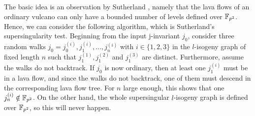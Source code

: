 The basic idea is an observation by Sutherland \cite{sutherland_supersingularity_test}, namely that the lava flows of an ordinary vulcano can only have a bounded number of levels defined over $\mathbb{F}_{p^2}$.
Hence, we can consider the following algorithm, which is Sutherland's supersingularity test.
Beginning from the input j-invariant $j_0$, consider three random walks $j_0 = j_0^{(i)}, j_1^{(i)}, ..., j_n^{(i)}$ with $i \in \{ 1, 2, 3 \}$ in the $l$-isogeny graph of fixed length $n$ such that $j_1^{(1)}, j_1^{(2)}$ and $j_1^{(3)}$ are distinct.
Furthermore, assume the walks do not backtrack.
If $j_0$ is now ordinary, then at least one $j_1^{(i)}$ must be in a lava flow, and since the walks do not backtrack, one of them must descend in the corresponding lava flow tree.
For $n$ large enough, this shows that one $j_n^{(i)} \notin \mathbb{F}_{p^2}$.
On the other hand, the whole supersingular $l$-isogeny graph is defined over $\mathbb{F}_{p^2}$, so this will never happen.

